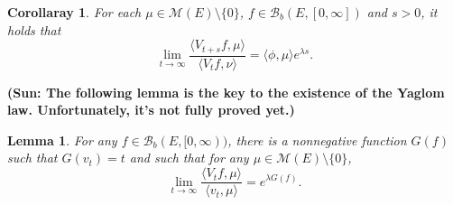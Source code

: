 \documentclass[12pt,a4paper]{amsart}
\numberwithin{equation}{section}
\theoremstyle{plain}
\newtheorem{lem}[thm]{Lemma}
\newtheorem{cor}[thm]{Corollaray}
\theoremstyle{definition}
\begin{document}

\begin{cor}\label{cor:general_rate}
	For each $\mu\in\mathcal M(E)\setminus\{0\}$, $f\in\mathcal B_b(E,[0,\infty])$ and $s>0$, it holds that
  \begin{equation}\label{eq:ratio_limits}
\lim_{t\rightarrow\infty}\frac{\langle V_{t+s}f,\mu\rangle }{\langle V_{t}f,\nu\rangle }
=\langle \phi,\mu\rangle e^{\lambda s}.
  \end{equation}
\end{cor}

{\bf (Sun: The following lemma is the key to the existence of the Yaglom law. Unfortunately, it's not fully proved yet.)}
\begin{lem}\label{eq:ratio_limits_2}
	For any $f\in\mathcal B_b(E,[0,\infty))$, there is a nonnegative function $G(f)$ such that $G(v_t)=t$ and such that for any $\mu\in\mathcal M(E)\setminus\{0\}$,
  \begin{equation}\label{eq:app_of_G}
    \lim_{t\rightarrow\infty}\frac{\langle V_tf,\mu\rangle }{\langle v_t,\mu\rangle }=e^{\lambda G(f)}.
  \end{equation}
\end{lem}
\end{document}
